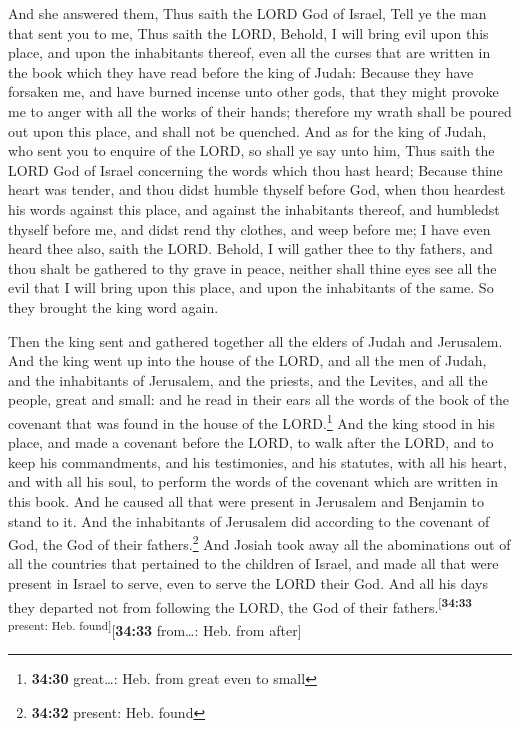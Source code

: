  And she answered them, Thus saith the LORD God of
Israel, Tell ye the man that sent you to me,  Thus saith
the LORD, Behold, I will bring evil upon this place, and upon the
inhabitants thereof, even all the curses that are written in the book
which they have read before the king of Judah:  Because
they have forsaken me, and have burned incense unto other gods, that
they might provoke me to anger with all the works of their hands;
therefore my wrath shall be poured out upon this place, and shall not be
quenched.  And as for the king of Judah, who sent you to
enquire of the LORD, so shall ye say unto him, Thus saith the LORD God
of Israel concerning the words which thou hast heard; 
Because thine heart was tender, and thou didst humble thyself before
God, when thou heardest his words against this place, and against the
inhabitants thereof, and humbledst thyself before me, and didst rend thy
clothes, and weep before me; I have even heard thee also, saith the
LORD.  Behold, I will gather thee to thy fathers, and
thou shalt be gathered to thy grave in peace, neither shall thine eyes
see all the evil that I will bring upon this place, and upon the
inhabitants of the same. So they brought the king word again.

 Then the king sent and gathered together all the elders
of Judah and Jerusalem.  And the king went up into the
house of the LORD, and all the men of Judah, and the inhabitants of
Jerusalem, and the priests, and the Levites, and all the people, great
and small: and he read in their ears all the words of the book of the
covenant that was found in the house of the LORD.\footnote{\textbf{34:30}
  great\ldots: Heb. from great even to small}  And the
king stood in his place, and made a covenant before the LORD, to walk
after the LORD, and to keep his commandments, and his testimonies, and
his statutes, with all his heart, and with all his soul, to perform the
words of the covenant which are written in this book. 
And he caused all that were present in Jerusalem and Benjamin to stand
to it. And the inhabitants of Jerusalem did according to the covenant of
God, the God of their fathers.\footnote{\textbf{34:32} present: Heb.
  found}  And Josiah took away all the abominations out
of all the countries that pertained to the children of Israel, and made
all that were present in Israel to serve, even to serve the LORD their
God. And all his days they departed not from following the LORD, the God
of their fathers.\textsuperscript{{[}\textbf{34:33} present: Heb.
found{]}}{[}\textbf{34:33} from\ldots: Heb. from after{]}

